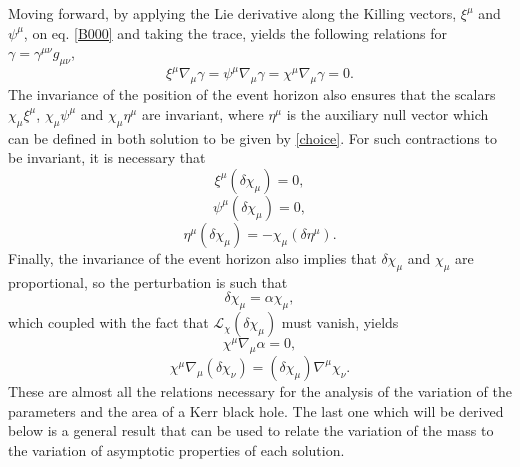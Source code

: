 \documentclass[
12pt,		%
openright,	%
twoside,  %
a4paper,			%
chapter=TITLE,		%
english,			%
french,				%
spanish,			%
brazil				%
]{USPSC-classe/USPSC}
\begin{document}
\begin{apendicesenv}
Moving forward, by applying the Lie derivative along the Killing vectors, $\xi^{\mu}$ and $\psi^{\mu}$, on eq. \ref{B000} and taking the trace, yields the following relations for $\gamma=\gamma^{\mu\nu}g_{\mu\nu}$,
\begin{equation}\label{Beq5}
     \xi^{\mu}\nabla_{\mu}\gamma=\psi^{\mu}\nabla_{\mu}\gamma=\chi^{\mu}\nabla_{\mu}\gamma=0.
\end{equation}
The invariance of the position of the event horizon also ensures that the scalars $\chi_{\mu}\xi^{\mu}$, $\chi_{\mu}\psi^{\mu}$ and $\chi_{\mu}\eta^{\mu}$ are invariant, where $\eta^{\mu}$ is the auxiliary null vector which can be defined in both solution to be given by \ref{choice}. For such contractions to be invariant, it is necessary that
\begin{equation}\label{Beq6}
    \xi^{\mu}(\delta\chi_{\mu})=0,
\end{equation}
\begin{equation}\label{Beq7}
    \psi^{\mu}(\delta\chi_{\mu})=0,
\end{equation}
\begin{equation}\label{Beq8}
    \eta^{\mu}(\delta\chi_{\mu})=-\chi_{\mu}(\delta\eta^{\mu}).
\end{equation}
Finally, the invariance of the event horizon also implies that $\delta\chi_{\mu}$ and $\chi_{\mu}$ are proportional, so the perturbation is such that 
\begin{equation}\label{Beq9}
    \delta\chi_{\mu}=\alpha\chi_{\mu},
\end{equation}
which coupled with the fact that $\mathcal{L}_{\chi}(\delta\chi_{\mu})$ must vanish, yields
\begin{equation}\label{Beq10}
    \chi^{\mu}\nabla_{\mu}\alpha=0,
\end{equation}
\begin{equation}\label{Beq1}
    \chi^{\mu}\nabla_{\mu}(\delta\chi_{\nu})=(\delta\chi_{\mu})\nabla^{\mu}\chi_{\nu}.
\end{equation}
These are almost all the relations necessary for the analysis of the variation of the parameters and the area of a Kerr black hole. The last one which will be derived below is a general result \cite{Wald1984} that can be used to relate the variation of the mass to the variation of asymptotic properties of each solution.


\end{apendicesenv}
\end{document}
